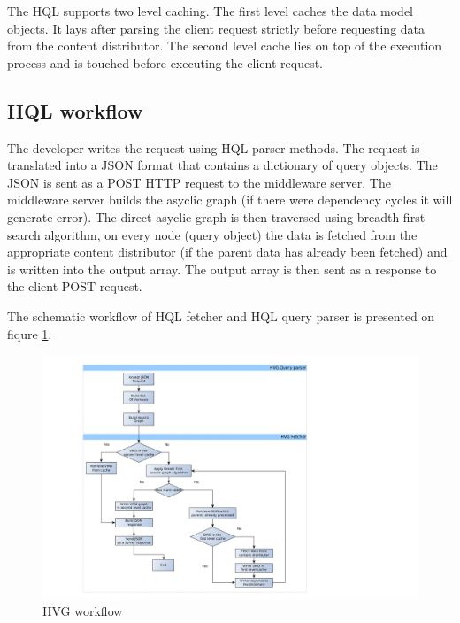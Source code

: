 The HQL supports two level caching. The first level caches the data model objects. It lays after parsing the client request strictly before requesting data from the content distributor. The second level cache lies on top of the execution process and is touched before executing the client request.  


\subsection{HQL workflow}

The developer writes the request using HQL parser methods. The request is translated into a JSON format that contains a dictionary of query objects. The JSON is sent as a POST HTTP request to the middleware server. The middleware server builds the asyclic graph (if there were dependency cycles it will generate error). The direct asyclic graph is then traversed using breadth first search algorithm, on every node (query object) the data is fetched from the appropriate content distributor (if the parent data has already been fetched) and is written into the output array. The output array is then sent as a response to the client POST request. 

The schematic workflow of HQL fetcher and HQL query parser is presented on fiqure \ref{fig:hvg_workflow}.

\begin{figure}[h]
	\begin{center}
		\includegraphics[width=20cm]{images/hvg_qp_workflow.png}
   		\caption{HVG workflow}
    	\label{fig:hvg_workflow}
	\end{center}
\end{figure}

